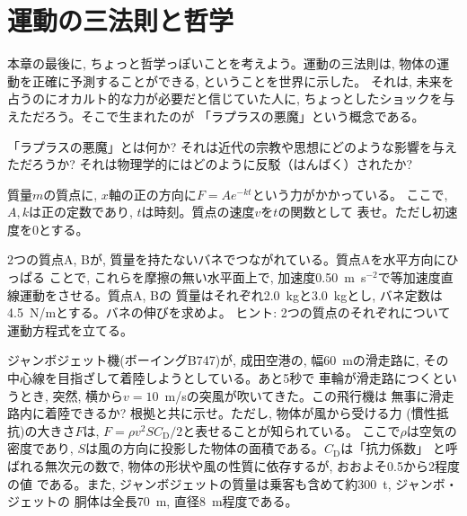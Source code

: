 \section{運動の三法則と哲学}

本章の最後に, ちょっと哲学っぽいことを考えよう。運動の三法則は, 
物体の運動を正確に予測することができる, ということを世界に示した。
それは, 未来を占うのにオカルト的な力が必要だと信じていた人に, 
ちょっとしたショックを与えただろう。そこで生まれたのが
「ラプラスの悪魔」という概念である。\mv

\begin{q}\label{q:Laplace_demon}
「ラプラスの悪魔」とは何か? それは近代の宗教や思想にどのような影響を与えただろうか? 
それは物理学的にはどのように反駁（はんばく）されたか? 
\end{q}
\hv

\begin{exq} 質量$m$の質点に, $x$軸の正の方向に$F=Ae^{-kt}$という力がかかっている。
ここで, $A, k$は正の定数であり, $t$は時刻。質点の速度$v$を$t$の関数として
表せ。ただし初速度を0とする。\end{exq}

\begin{exq} 2つの質点A, Bが, 質量を持たないバネでつながれている。質点Aを水平方向にひっぱる
ことで, これらを摩擦の無い水平面上で, 加速度0.50~m~s$^{-2}$で等加速度直線運動をさせる。質点A, Bの
質量はそれぞれ2.0~kgと3.0~kgとし, バネ定数は4.5~N/mとする。バネの伸びを求めよ。
ヒント: 2つの質点のそれぞれについて運動方程式を立てる。\end{exq}

\begin{exq} ジャンボジェット機(ボーイングB747)が, 成田空港の, 
幅60~mの滑走路に, その中心線を目指ざして着陸しようとしている。あと5秒で
車輪が滑走路につくというとき, 突然, 横から$v=10$~m/sの突風が吹いてきた。この飛行機は
無事に滑走路内に着陸できるか? 根拠と共に示せ。ただし, 物体が風から受ける力
(慣性抵抗)の大きさ$F$は, $F=\rho v^2 S C_{\text{D}}/2$と表せることが知られている。
ここで$\rho$は空気の密度であり, $S$は風の方向に投影した物体の面積である。$C_{\text{D}}$は「抗力係数」
と呼ばれる無次元の数で, 物体の形状や風の性質に依存するが, おおよそ0.5から2程度の値
である。また, ジャンボジェットの質量は乗客も含めて約300~t, ジャンボ・ジェットの
胴体は全長70~m, 直径8~m程度である。\end{exq}




